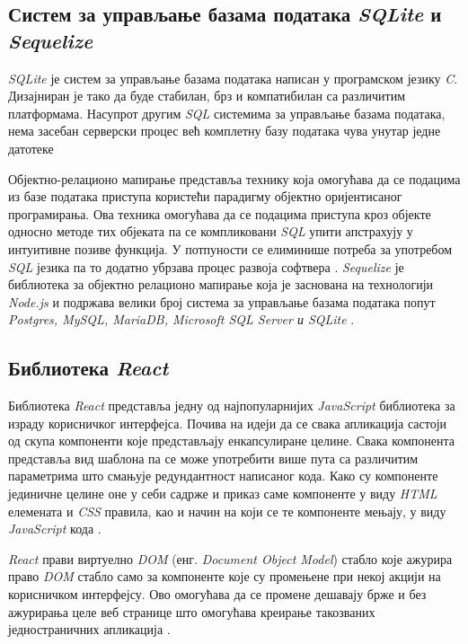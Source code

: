 \documentclass[12pt,oneside]{memoir}
\begin{document}
\subsection{Систем за управљање базама података \textit{SQLite} и \textit{Sequelize}}

\textit{SQLite} је систем за управљање базама података написан у програмском језику \textit{C}. Дизајниран је тако да буде стабилан, брз и компатибилан са различитим платформама.  Насупрот другим \textit{SQL} системима за управљање базама података, нема засебан серверски процес већ комплетну базу података чува унутар једне датотеке \cite{sqlite,sqlitetutorial}

Објектно-релационо мапирање представља технику која омогућава да се подацима из базе података приступа користећи парадигму објектно оријентисаног програмирања. Ова техника омогућава да се подацима приступа кроз објекте односно методе тих објеката па се компликовани \textit{SQL} упити апстрахују у интуитивне позиве функција. У потпуности се елиминише потреба за употребом \textit{SQL} језика па то додатно убрзава процес развоја софтвера \cite{orm}. \textit{Sequelize} је библиотека за објектно релационо мапирање која је заснована на технологији \textit{ Node.js} и подржава велики број система за управљање базама података попут \textit{Postgres, MySQL, MariaDB, Microsoft SQL Server и SQLite} \cite{sequelize}.

\subsection{Библиотека \textit{React}}
\label{section:react}
Библиотека \textit{React} представља једну од најпопуларнијих \textit{JavaScript} библиотека за израду корисничког интерфејса.  Почива на идеји да се свака апликација састоји од скупа компоненти које представљају енкапсулиране целине. Свака компонента представља вид шаблона па се може употребити више пута са различитим параметрима што смањује редундантност написаног кода. Како су компоненте јединичне целине оне у себи садрже и приказ саме компоненте у виду \textit{HTML} елемената и \textit{CSS} правила, као и начин на који се те компоненте мењају, у виду \textit{JavaScript} кода \cite{react}.

\textit{React} прави виртуелно \textit{DOM} (енг. \textit{Document Object Model}) стабло које ажурира право \textit{DOM} стабло само за компоненте које су промењене при некој акцији на корисничком интерфејсу. Ово омогућава да се промене дешавају брже и без ажурирања целе веб странице што омогућава креирање такозваних једностраничних апликација \cite{react}. 
\end{document}
